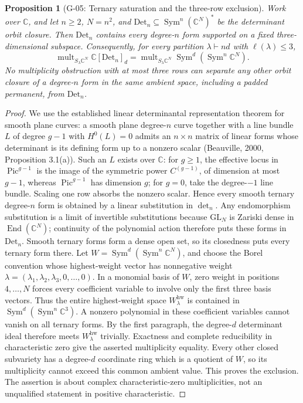 \documentclass[11pt,a4paper]{article}
\newtheorem{proposition}{Proposition}
\theoremstyle{definition}\newtheorem{definition}{Definition}
\begin{document}
\begin{proposition}[G-05: Ternary saturation and the three-row exclusion]\label{G-05}
Work over $\mathbb C$, and let $n\geq2$, $N=n^2$, and $\mathrm{Det}_n\subseteq\operatorname{Sym}^n(\mathbb C^N)^*$ be the determinant orbit closure. Then $\mathrm{Det}_n$ contains every degree-$n$ form supported on a fixed three-dimensional subspace. Consequently, for every partition $\lambda\vdash nd$ with $\ell(\lambda)\leq3$,
\[
 \operatorname{mult}_{S_\lambda\mathbb C^N}\mathbb C[\mathrm{Det}_n]_d
 =\operatorname{mult}_{S_\lambda\mathbb C^N}\operatorname{Sym}^d(\operatorname{Sym}^n\mathbb C^N).
\]
No multiplicity obstruction with at most three rows can separate any other orbit closure of a degree-$n$ form in the same ambient space, including a padded permanent, from $\mathrm{Det}_n$.
\end{proposition}
\begin{proof}
We use the established linear determinantal representation theorem for smooth plane curves: a smooth plane degree-$n$ curve together with a line bundle $L$ of degree $g-1$ with $H^0(L)=0$ admits an $n\times n$ matrix of linear forms whose determinant is its defining form up to a nonzero scalar (Beauville, 2000, Proposition 3.1(a)). Such an $L$ exists over $\mathbb C$: for $g\geq1$, the effective locus in $\operatorname{Pic}^{g-1}$ is the image of the symmetric power $C^{(g-1)}$, of dimension at most $g-1$, whereas $\operatorname{Pic}^{g-1}$ has dimension $g$; for $g=0$, take the degree-$-1$ line bundle. Scaling one row absorbs the nonzero scalar. Hence every smooth ternary degree-$n$ form is obtained by a linear substitution in $\det_n$. Any endomorphism substitution is a limit of invertible substitutions because $\mathrm{GL}_N$ is Zariski dense in $\operatorname{End}(\mathbb C^N)$; continuity of the polynomial action therefore puts these forms in $\mathrm{Det}_n$. Smooth ternary forms form a dense open set, so its closedness puts every ternary form there.
Let $W=\operatorname{Sym}^d(\operatorname{Sym}^n\mathbb C^N)$, and choose the Borel convention whose highest-weight vector has nonnegative weight $\lambda=(\lambda_1,\lambda_2,\lambda_3,0,\ldots,0)$. In a monomial basis of $W$, zero weight in positions $4,\ldots,N$ forces every coefficient variable to involve only the first three basis vectors. Thus the entire highest-weight space $W_\lambda^{\mathrm{hw}}$ is contained in $\operatorname{Sym}^d(\operatorname{Sym}^n\mathbb C^3)$. A nonzero polynomial in these coefficient variables cannot vanish on all ternary forms. By the first paragraph, the degree-$d$ determinant ideal therefore meets $W_\lambda^{\mathrm{hw}}$ trivially. Exactness and complete reducibility in characteristic zero give the asserted multiplicity equality. Every other closed subvariety has a degree-$d$ coordinate ring which is a quotient of $W$, so its multiplicity cannot exceed this common ambient value. This proves the exclusion. The assertion is about complex characteristic-zero multiplicities, not an unqualified statement in positive characteristic.
\end{proof}
\end{document}
